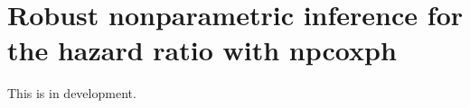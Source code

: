 \documentclass{article}
\begin{document}
\section{Robust nonparametric inference for the hazard ratio with npcoxph}
This is in development. \nocite{vanderLaanetal2007}



\end{document}

